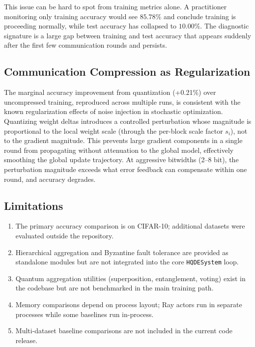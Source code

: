 \documentclass[journal,twoside]{IEEEtran}
\begin{document}
This issue can be hard to spot from training metrics alone. A
practitioner monitoring only training accuracy would see $85.78\%$ and
conclude training is proceeding normally,
while test accuracy has collapsed to $10.00\%$. The diagnostic
signature is a large gap between training and test accuracy that
appears suddenly after the first few communication rounds and persists.

\subsection{Communication Compression as Regularization}

The marginal accuracy improvement from quantization (+0.21\%) over
uncompressed training, reproduced across multiple runs, is consistent
with the known regularization effects of noise injection in stochastic
optimization. Quantizing weight deltas introduces a controlled
perturbation whose magnitude is proportional to the local weight scale
(through the per-block scale factor $s_i$), not to the gradient
magnitude. This prevents large gradient components in a single round
from propagating without attenuation to the global model, effectively
smoothing the global update trajectory. At aggressive bitwidths (2--8
bit), the perturbation magnitude exceeds what error feedback can
compensate within one round, and accuracy degrades.

\subsection{Limitations}

\begin{enumerate}
  \item The primary accuracy comparison is on CIFAR-10; additional
        datasets were evaluated outside the repository.
  \item Hierarchical aggregation and Byzantine fault tolerance are
        provided as standalone modules but are not integrated into the
        core \texttt{HQDESystem} loop.
  \item Quantum aggregation utilities (superposition, entanglement,
        voting) exist in the codebase but are not benchmarked in the main
        training path.
  \item Memory comparisons depend on process layout; Ray actors run in
        separate processes while some baselines run in-process.
  \item Multi-dataset baseline comparisons are not included in the
        current code release.
\end{enumerate}
\end{document}
